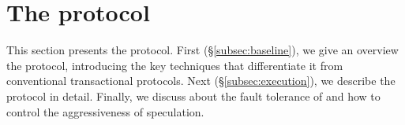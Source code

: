 \section{The \specula protocol}
\label{sec:protocol}
This section presents the \specula protocol. First (\S \ref{subsec:baseline}), we give an overview the protocol, introducing the key techniques that differentiate it from conventional transactional protocols. Next (\S \ref{subsec:execution}), we describe the protocol in detail. Finally, we discuss about the fault tolerance of \specula and how to control the aggressiveness of speculation.

